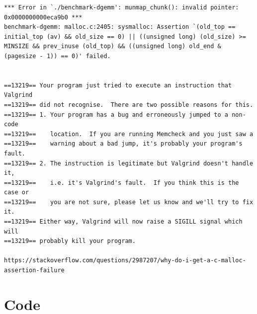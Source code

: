 \documentclass[a4paper,10pt,titlepage]{report}
\begin{document}
\begin{lstlisting}
*** Error in `./benchmark-dgemm': munmap_chunk(): invalid pointer: 0x0000000000eca9b0 ***
benchmark-dgemm: malloc.c:2405: sysmalloc: Assertion `(old_top == initial_top (av) && old_size == 0) || ((unsigned long) (old_size) >= MINSIZE && prev_inuse (old_top) && ((unsigned long) old_end & (pagesize - 1)) == 0)' failed.


==13219== Your program just tried to execute an instruction that Valgrind
==13219== did not recognise.  There are two possible reasons for this.
==13219== 1. Your program has a bug and erroneously jumped to a non-code
==13219==    location.  If you are running Memcheck and you just saw a
==13219==    warning about a bad jump, it's probably your program's fault.
==13219== 2. The instruction is legitimate but Valgrind doesn't handle it,
==13219==    i.e. it's Valgrind's fault.  If you think this is the case or
==13219==    you are not sure, please let us know and we'll try to fix it.
==13219== Either way, Valgrind will now raise a SIGILL signal which will
==13219== probably kill your program.

https://stackoverflow.com/questions/2987207/why-do-i-get-a-c-malloc-assertion-failure
\end{lstlisting}


\section{Code}



%
\end{document}
